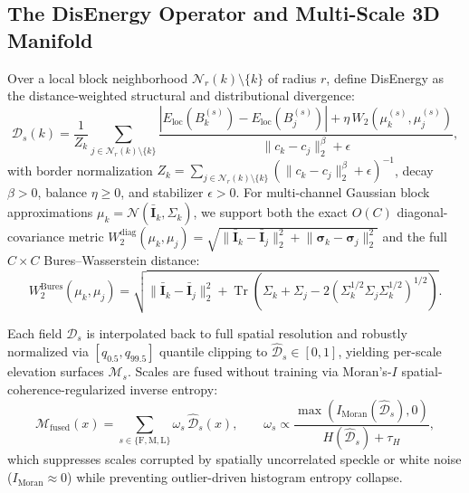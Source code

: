 \subsection{The DisEnergy Operator and Multi-Scale 3D Manifold}
Over a local block neighborhood $\mathcal{N}_r(k) \setminus \{k\}$ of radius $r$, define DisEnergy as the distance-weighted structural and distributional divergence:
\begin{equation}
\mathcal{D}_s(k) = \frac{1}{Z_k} \sum_{j \in \mathcal{N}_r(k) \setminus \{k\}} \frac{\left\lvert E_{\mathrm{loc}}\!\left(B_k^{(s)}\right) - E_{\mathrm{loc}}\!\left(B_j^{(s)}\right)\right\rvert + \eta\,W_2\!\left(\mu_k^{(s)}, \mu_j^{(s)}\right)}{\lVert c_k - c_j\rVert_2^\beta + \epsilon},
\label{eq:disenergy}
\end{equation}
with border normalization $Z_k = \sum_{j \in \mathcal{N}_r(k)\setminus\{k\}} (\lVert c_k - c_j\rVert_2^\beta + \epsilon)^{-1}$, decay $\beta > 0$, balance $\eta \ge 0$, and stabilizer $\epsilon > 0$. For multi-channel Gaussian block approximations $\mu_k = \mathcal{N}(\bar{\mathbf{I}}_k, \Sigma_k)$, we support both the exact $O(C)$ diagonal-covariance metric $W_2^{\mathrm{diag}}(\mu_k, \mu_j) = \sqrt{\lVert \bar{\mathbf{I}}_k - \bar{\mathbf{I}}_j\rVert_2^2 + \lVert \boldsymbol{\sigma}_k - \boldsymbol{\sigma}_j\rVert_2^2}$ and the full $C \times C$ Bures--Wasserstein distance:
\begin{equation}
W_2^{\mathrm{Bures}}(\mu_k, \mu_j) = \sqrt{\lVert \bar{\mathbf{I}}_k - \bar{\mathbf{I}}_j\rVert_2^2 + \operatorname{Tr}\!\left(\Sigma_k + \Sigma_j - 2\left(\Sigma_k^{1/2}\Sigma_j\Sigma_k^{1/2}\right)^{1/2}\right)}.
\label{eq:bures}
\end{equation}

Each field $\mathcal{D}_s$ is interpolated back to full spatial resolution and robustly normalized via $[q_{0.5}, q_{99.5}]$ quantile clipping to $\widehat{\mathcal{D}}_s \in [0,1]$, yielding per-scale elevation surfaces $\mathcal{M}_s$. Scales are fused without training via Moran's-$I$ spatial-coherence-regularized inverse entropy:
\begin{equation}
\mathcal{M}_{\mathrm{fused}}(x) = \sum_{s \in \{\mathrm{F},\mathrm{M},\mathrm{L}\}} \omega_s\,\widehat{\mathcal{D}}_s(x), \qquad \omega_s \propto \frac{\max(I_{\mathrm{Moran}}(\widehat{\mathcal{D}}_s), 0)}{H(\widehat{\mathcal{D}}_s) + \tau_H},
\label{eq:fusion}
\end{equation}
which suppresses scales corrupted by spatially uncorrelated speckle or white noise ($I_{\mathrm{Moran}} \approx 0$) while preventing outlier-driven histogram entropy collapse.

